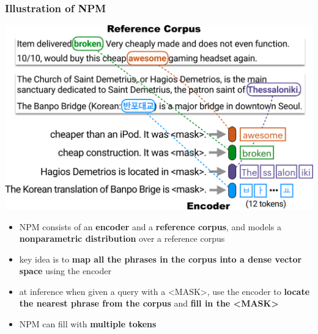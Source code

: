 \documentclass{beamer}
\begin{document}
\begin{frame}
    \frametitle{Illustration of NPM}
    \begin{center}
        \includegraphics[scale=0.58]{img/npm1.png}
    \end{center}
    \begin{itemize}
        \footnotesize
        \item NPM consists of an \textbf{encoder} and a \textbf{reference corpus}, and models a \textbf{nonparametric distribution} over a reference corpus
        \item key idea is to \textbf{map all the phrases in the corpus into a dense vector space} using the encoder
        \item at inference when given a query with a <MASK>, use the encoder to \textbf{locate the nearest phrase from the corpus} and \textbf{fill in the <MASK>}
        \item NPM can fill with \textbf{multiple tokens}
    \end{itemize}
\end{frame}
\end{document}
